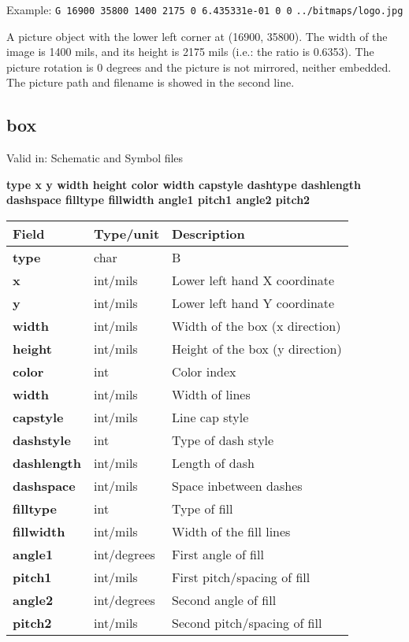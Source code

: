 \documentclass{article}
\begin{document}
Example:\newline 
{\tt G 16900 35800 1400 2175 0 6.435331e-01 0 0}\newline
{\tt ../bitmaps/logo.jpg}

A picture object with the lower left corner at (16900, 35800). The width of the image is 1400 mils, and its height is 2175 mils (i.e.: the ratio is 0.6353). \newline
The picture rotation is 0 degrees and the picture is not mirrored, neither embedded.\newline
The picture path and filename is showed in the second line. \newline


\subsection{box}

Valid in: Schematic and Symbol files

{\bf type x y width height color width capstyle dashtype dashlength dashspace filltype fillwidth angle1 pitch1 angle2 pitch2 }

\begin{table}[h]
\begin{tabular}{|l|l|l|} \hline
Field 		& Type/unit 	& Description \\ \hline 
\hline
{\bf type} 	& char		& B \\ \hline
{\bf x} 	& int/mils	& Lower left hand X coordinate \\ \hline 
{\bf y} 	& int/mils	& Lower left hand Y coordinate \\ \hline
{\bf width} 	& int/mils 	& Width of the box (x direction) \\ \hline
{\bf height} 	& int/mils 	& Height of the box (y direction) \\ \hline
{\bf color} 	& int 		& Color index \\ \hline
{\bf width} 	& int/mils 	& Width of lines \\ \hline
{\bf capstyle} 	& int/mils	& Line cap style \\ \hline
{\bf dashstyle} & int 		& Type of dash style \\ \hline
{\bf dashlength}& int/mils	& Length of dash \\ \hline
{\bf dashspace} & int/mils	& Space inbetween dashes \\ \hline
{\bf filltype}  & int		& Type of fill \\ \hline
{\bf fillwidth} & int/mils	& Width of the fill lines \\ \hline
{\bf angle1} 	& int/degrees	& First angle of fill \\ \hline
{\bf pitch1} 	& int/mils	& First pitch/spacing of fill \\ \hline
{\bf angle2} 	& int/degrees 	& Second angle of fill \\ \hline
{\bf pitch2} 	& int/mils	& Second pitch/spacing of fill \\ \hline
\end{tabular}
\end{table}
\end{document}
